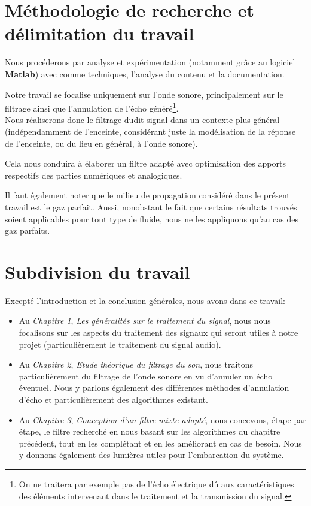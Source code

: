 \section{Méthodologie de recherche et délimitation du travail}
Nous procéderons par analyse et expérimentation (notamment grâce au logiciel \textbf{Matlab}) avec comme techniques, l'analyse du contenu et la documentation.

Notre travail se focalise uniquement sur l'onde sonore, principalement sur le filtrage ainsi que l'annulation de l'écho généré\footnote{On ne traitera par exemple pas de l'écho électrique dû aux caractéristiques des éléments intervenant dans le traitement et la transmission du signal.}.\\
Nous réaliserons donc le filtrage dudit signal dans un contexte plus général (indépendamment de l'enceinte, considérant juste la modélisation de la réponse de l'enceinte, ou du lieu en général, à l'onde sonore).

Cela nous conduira à élaborer un filtre adapté avec optimisation des apports respectifs des parties numériques et analogiques.

Il faut également noter que le milieu de propagation considéré dans le présent travail est le gaz parfait. Aussi, nonobstant le fait que certains résultats trouvés soient applicables pour tout type de fluide, nous ne les appliquons qu'au cas des gaz parfaits. 
\section{Subdivision du travail}
Excepté l'introduction et la conclusion générales, nous avons dans ce travail:
\begin{itemize}
\item Au \emph{Chapitre 1}, \textit{Les généralités sur le traitement du signal}, nous nous focalisons sur les aspects du traitement des signaux qui seront utiles à notre projet (particulièrement le traitement du signal audio).\\
\item Au \emph{Chapitre 2}, \textit{Etude théorique du filtrage du son}, nous traitons particulièrement du filtrage de l'onde sonore en vu d'annuler un écho éventuel.
Nous y parlons également des différentes méthodes d'annulation d'écho et particulièrement des algorithmes existant.
\item Au \emph{Chapitre 3}, \textit{Conception d'un filtre mixte adapté}, nous concevons, étape par étape, le filtre recherché en nous basant sur les algorithmes du chapitre précédent, tout en les complétant et en les améliorant en cas de besoin. Nous y donnons également des lumières utiles pour l'embarcation du système.
\end{itemize}
